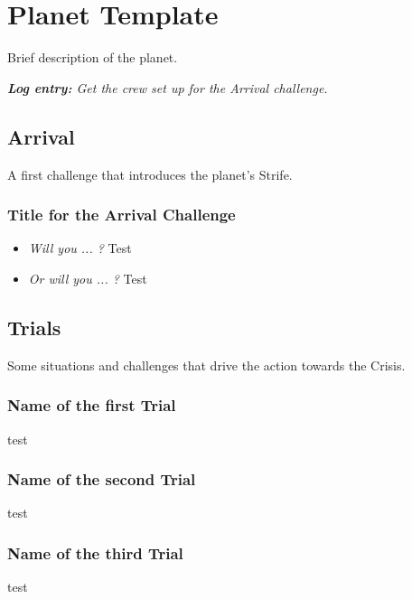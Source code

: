\documentclass[11pt, a5paper, parskip=half-, DIV=12]{scrartcl}
\begin{document}

\section*{Planet Template}
Brief description of the planet.

\textit{\textbf{Log entry:} Get the crew set up for the Arrival challenge.}

\subsection*{Arrival}
A first challenge that introduces the planet's Strife.

\subsubsection*{Title for the Arrival Challenge}
\begin{itemize}
	\item \textit{Will you ... ?} Test
	\item \textit{Or will you ... ?} Test
\end{itemize}

\newpage

\subsection*{Trials}
Some situations and challenges that drive the action towards the Crisis.

\subsubsection*{Name of the first Trial}
test

\subsubsection*{Name of the second Trial}
test

\subsubsection*{Name of the third Trial}
test
\end{document}
